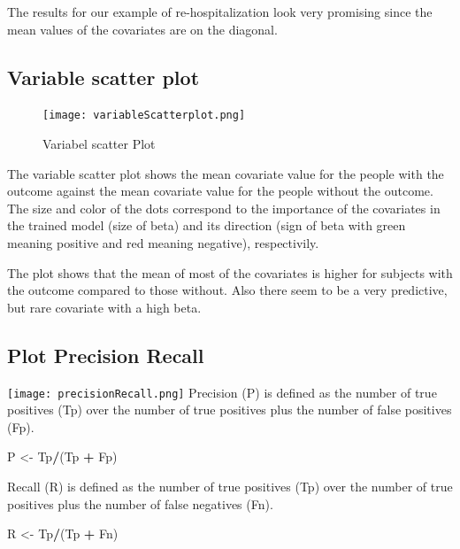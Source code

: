 \documentclass[]{article}
\newenvironment{Shaded}{\begin{snugshade}}{\end{snugshade}}
\newcommand{\StringTok}[1]{\textcolor[rgb]{0.31,0.60,0.02}{#1}}
\newcommand{\OperatorTok}[1]{\textcolor[rgb]{0.81,0.36,0.00}{\textbf{#1}}}
\newcommand{\NormalTok}[1]{#1}
\begin{document}
The results for our example of re-hospitalization look very promising
since the mean values of the covariates are on the diagonal.

\subsection{Variable scatter plot}\label{variable-scatter-plot}

\begin{figure}
\centering
\texttt{[image: variableScatterplot.png]}
\caption{Variabel scatter Plot}
\end{figure}

The variable scatter plot shows the mean covariate value for the people
with the outcome against the mean covariate value for the people without
the outcome. The size and color of the dots correspond to the importance
of the covariates in the trained model (size of beta) and its direction
(sign of beta with green meaning positive and red meaning negative),
respectivily.

The plot shows that the mean of most of the covariates is higher for
subjects with the outcome compared to those without. Also there seem to
be a very predictive, but rare covariate with a high beta.

\subsection{Plot Precision Recall}\label{plot-precision-recall}

\texttt{[image: precisionRecall.png]} Precision (P) is defined as the
number of true positives (Tp) over the number of true positives plus the
number of false positives (Fp).

\begin{Shaded}
\begin{Highlighting}[]
\NormalTok{P <-}\StringTok{ }\NormalTok{Tp}\OperatorTok{/}\NormalTok{(Tp }\OperatorTok{+}\StringTok{ }\NormalTok{Fp)}
\end{Highlighting}
\end{Shaded}

Recall (R) is defined as the number of true positives (Tp) over the
number of true positives plus the number of false negatives (Fn).

\begin{Shaded}
\begin{Highlighting}[]
\NormalTok{R <-}\StringTok{ }\NormalTok{Tp}\OperatorTok{/}\NormalTok{(Tp }\OperatorTok{+}\StringTok{ }\NormalTok{Fn)}
\end{Highlighting}
\end{Shaded}
\end{document}
